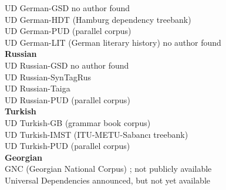 \begin{tabbing}
	UD German-GSD
		\> 	\href{https://github.com/UniversalDependencies/UD_German-GSD/tree/master}{}
		\>	no author found
	\\[2mm]
	UD German-HDT {\footnotesize(Hamburg dependency treebank)}
		\> 	\href{https://github.com/UniversalDependencies/UD_German-HDT/tree/master}{}
		\>	\citep{Foth.2014}
	\\[2mm]
	UD German-PUD {\footnotesize(parallel corpus)}
		\> 	\href{https://github.com/UniversalDependencies/UD_German-PUD/tree/master}{}
		\>	\citep{McDonald.2013}
	\\[2mm]
	UD German-LIT {\footnotesize(German literary history)}
		\> 	\href{https://github.com/UniversalDependencies/UD_German-LIT/tree/master}{}
		\>	no author found
	\\[3mm]
	 \textbf{Russian} \>
	\\[2mm]
	UD Russian-GSD
		\> 	\href{https://github.com/UniversalDependencies/UD_Russian-GSD/tree/master}{}
		\>	no author found
	\\[2mm]
	UD Russian-SynTagRus
		\> 	\href{https://github.com/UniversalDependencies/UD_Russian-SynTagRus/tree/master}{}
		\>	\citep{Droganova.2018}
	\\[2mm]
	UD Russian-Taiga
		\> 	\href{https://github.com/UniversalDependencies/UD_Russian-Taiga/tree/master}{}
		\>	\citep{Shavrina.2017}
	\\[2mm]
	UD Russian-PUD {\footnotesize(parallel corpus)}
		\> 	\href{https://github.com/UniversalDependencies/UD_Russian-PUD/tree/master}{}
		\>	\citep{McDonald.2013}
	\\[3mm]
	 \textbf{Turkish}
	\\[2mm]
	UD Turkish-GB {\footnotesize(grammar book corpus)}
		\> 	\href{https://github.com/UniversalDependencies/UD_Turkish-GB}{}
		\>	\citep{Coltekin.2017}
	\\[2mm]
	UD Turkish-IMST {\footnotesize(ITU-METU-Sabancı treebank)}
		\>	\href{https://github.com/UniversalDependencies/UD_Turkish-IMST}{}
		\>	\citep{Sulubacak.2016}
	\\[2mm]
	UD Turkish-PUD {\footnotesize(parallel corpus)}
		\>	\href{https://github.com/UniversalDependencies/UD_Turkish-PUD}{}
		\>	\citep{McDonald.2013}
	\\[3mm]
	 \textbf{Georgian}
	\\[0.5mm]
	GNC (Georgian National Corpus)
		\> 	\href{http://gnc.gov.ge/gnc/page}{}; not publicly available
		\>	
	\\[2mm]
	Universal Dependencies
		\> 	announced, but not yet available
		\>
\end{tabbing}

